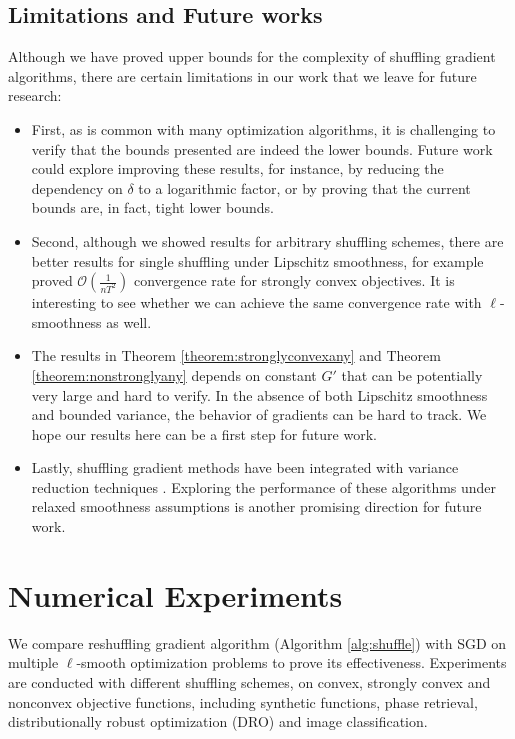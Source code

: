 \documentclass{article} %
\theoremstyle{plain}
\theoremstyle{definition}
\theoremstyle{remark}
\begin{document}

\subsection{Limitations and Future works}

Although we have proved upper bounds for the complexity of shuffling gradient algorithms, there are certain limitations in our work that we leave for future research:

\begin{itemize}
    \item First, as is common with many optimization algorithms, it is challenging to verify that the bounds presented are indeed the lower bounds. Future work could explore improving these results, for instance, by reducing the dependency on $\delta$ to a logarithmic factor, or by proving that the current bounds are, in fact, tight lower bounds.
    \item Second, although we showed results for arbitrary shuffling schemes, there are better results for single shuffling under Lipschitz smoothness, for example \citet{ahn2020sgd} proved $\mathcal{O}(\frac{1}{nT^2})$ convergence rate for strongly convex objectives. It is interesting to see whether we can achieve the same convergence rate with $\ell$-smoothness as well.
    \item The results in Theorem \ref{theorem:stronglyconvexany} and Theorem \ref{theorem:nonstronglyany} depends on constant $G'$ that can be potentially very large and hard to verify. In the absence of both Lipschitz smoothness and bounded variance, the behavior of gradients can be hard to track. We hope our results here can be a first step for future work.
    \item Lastly, shuffling gradient methods have been integrated with variance reduction techniques \citep{malinovsky2023random}. Exploring the performance of these algorithms under relaxed smoothness assumptions is another promising direction for future work.
\end{itemize}

\section{Numerical Experiments}
We compare reshuffling gradient algorithm (Algorithm \ref{alg:shuffle}) with SGD on multiple $\ell$-smooth optimization problems to prove its effectiveness. Experiments are conducted with different shuffling schemes, on convex, strongly convex and nonconvex objective functions, including synthetic functions, phase retrieval, distributionally robust optimization (DRO) and image classification. 
\end{document}
